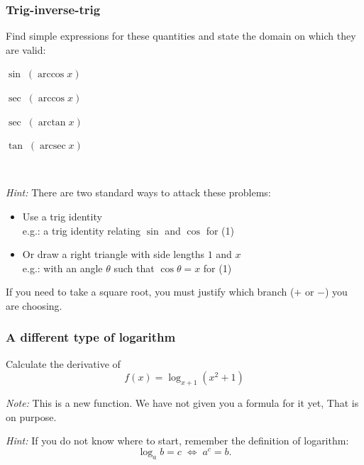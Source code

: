 \documentclass[14pt]{beamer}
\newcommand {\DS} [1] {${\displaystyle #1}$}
\newcommand{\p}{\pause}
\newcommand{\setsize}[1]{\fontsize{#1}{#1}\selectfont} %
\newcommand{\smallerfont}{\setsize{13}} %
\newcommand{\arcsec}{\operatorname{arcsec}}
\begin{document}
\begin{frame}[t]
\frametitle{Trig-inverse-trig}

\begin{block}{}
Find simple expressions for these quantities and state the domain on which they are valid:
	\begin{enumerate}
	\begin{multicols}{2}
		\item  \DS{\sin \; ( \arccos x)}
		\item \DS{\sec \; (\arccos x)}
		\item \DS{\sec \; ( \arctan x)}
		\item \DS{\tan \; (\arcsec x)}
	\end{multicols}
	\end{enumerate}
\vspace{-.1cm}	
\end{block}

\ \p

{\smallerfont
\emph{Hint:}  There are two standard ways to attack these problems:
	\begin{itemize}
		\item  Use a trig identity  \\  e.g.: a trig identity relating $\sin$ and $\cos$ for (1)
		\item  Or draw a right triangle with side lengths $1$ and $x$ 
			\\ e.g.: with an angle $\theta$ such that $\cos \theta = x$ for (1)
	\end{itemize}
If you need to take a square root, you must justify which branch ($+$ or $-$) you are choosing.
}

\end{frame}



\begin{frame}[t]
\frametitle{A different type of logarithm}

Calculate the derivative of 
	$$
		f(x) = \log_{x+1} (x^2+1)
	$$
	
\vfill

\emph{Note:}  This is a new function.  We have not given you a formula for it yet,  That is on purpose.

\vfill \p

\emph{Hint:}  If you do not know where to start, remember the definition of logarithm:
	$$
	\log_a b = c \; \iff \; a^c = b.
	$$
	

\end{frame}
\end{document}
